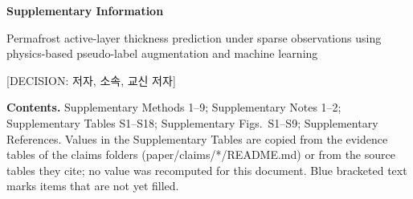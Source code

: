 \documentclass[pdflatex,sn-nature]{sn-jnl}
\begin{document}
\begin{center}
{\LARGE\bfseries Supplementary Information\par}
\medskip
{\large Permafrost active-layer thickness prediction under sparse observations using physics-based pseudo-label augmentation and machine learning\par}
\medskip
{\small [DECISION: 저자, 소속, 교신 저자]\par}
\end{center}
\bigskip

\noindent\textbf{Contents.} Supplementary Methods 1--9; Supplementary Notes 1--2; Supplementary Tables S1--S18; Supplementary Figs.~S1--S9; Supplementary References.
Values in the Supplementary Tables are copied from the evidence tables of the claims folders (paper/claims/*/README.md) or from the source tables they cite; no value was recomputed for this document. Blue bracketed text marks items that are not yet filled.



\renewcommand{\refname}{Supplementary References}

\end{document}
